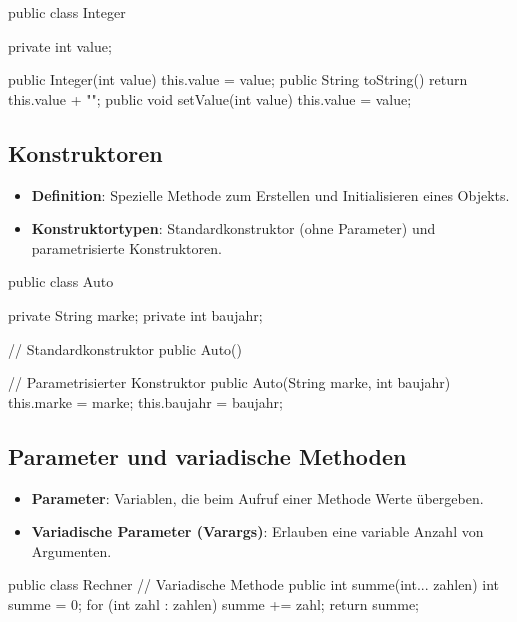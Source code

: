 \documentclass[a4paper,10pt, dvipsnames]{report}
\begin{document}
\begin{javacodebox}
public class Integer {

    private int value;

    public Integer(int value) {
    this.value = value;
    }
    public String toString() {
    return this.value + "";
    }
    public void setValue(int value) {
    this.value = value;
    }
}
\end{javacodebox}



\subsection{Konstruktoren}

\begin{itemize}
    \item \textbf{Definition}: Spezielle Methode zum Erstellen und Initialisieren eines Objekts.
    \item \textbf{Konstruktortypen}: Standardkonstruktor (ohne Parameter) und parametrisierte Konstruktoren.
\end{itemize}

\begin{javacodebox}
public class Auto {
    private String marke;
    private int baujahr;

    // Standardkonstruktor
    public Auto() {
    }

    // Parametrisierter Konstruktor
    public Auto(String marke, int baujahr) {
        this.marke = marke;
        this.baujahr = baujahr;
    }
}
\end{javacodebox}



\subsection{Parameter und variadische Methoden}

\begin{itemize}
    \item \textbf{Parameter}: Variablen, die beim Aufruf einer Methode Werte übergeben.
    \item \textbf{Variadische Parameter (Varargs)}: Erlauben eine variable Anzahl von Argumenten.
\end{itemize}

\begin{javacodebox}
public class Rechner {
    // Variadische Methode
    public int summe(int... zahlen) {
        int summe = 0;
        for (int zahl : zahlen) {
            summe += zahl;
        }
        return summe;
    }
}
\end{javacodebox}
\end{document}
